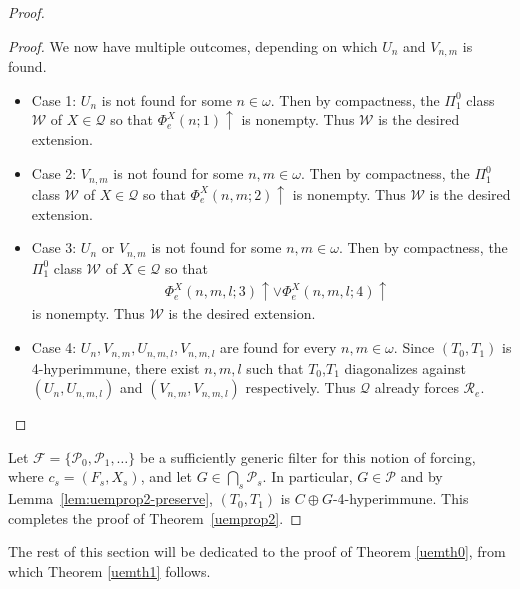 \documentclass{amsart}
\theoremstyle{definition}
\theoremstyle{remark}
\numberwithin{equation}{section}
\theoremstyle{noparens}
\def\mcal{\mathcal}
\newcommand{\Fcal}{\mathcal{F}}
\def\iatfshyp{4-hyperimmune}
\def\diagonalagainst{diagonalizes against}
\begin{document}
\begin{proof}
\begin{proof}
\smallskip

We now have multiple outcomes, depending on which $U_n$ and $V_{n,m}$ is found.
\begin{itemize}
	\item Case 1: $U_n$ is not found for some $n \in \omega$.
	Then by compactness,
the  $\Pi_1^0$ class $\mcal{W}$ of $X\in \mcal{Q}$ so that
$\Phi_e^X(n;1)\uparrow$ is nonempty.
Thus $\mcal{W}$ is the desired extension.

	\item Case 2: $V_{n,m}$ is not found for some $n, m \in \omega$.
Then by compactness,
the  $\Pi_1^0$ class $\mcal{W}$ of $X\in \mcal{Q}$ so that
$\Phi_{e}^{X}(n, m;2) \uparrow$ is nonempty.
Thus $\mcal{W}$ is the desired extension.

	\item Case 3: $U_n$ or $V_{n,m}$ is not found for some $n,m \in \omega$.
	Then by compactness,
the  $\Pi_1^0$ class $\mcal{W}$ of $X\in \mcal{Q}$ so that
\begin{align}\nonumber
&\Phi_e^X(n,m,l;3)\uparrow\vee
\Phi_e^X(n,m,l;4)\uparrow
\end{align}
is nonempty.
Thus $\mcal{W}$ is the desired extension.

\item Case 4: $U_n, V_{n,m},U_{n,m,l},V_{n,m,l}$ are found for every $n,m \in \omega$.
Since $(T_0,T_1)$ is \iatfshyp, there exist
$n, m,l$ such that $T_0$,$T_1$ \diagonalagainst\
$(U_{n},U_{n,m,l})$ and
$(V_{n, m},V_{n, m,l})$ respectively.
Thus $\mcal{Q}$ already forces $\mathcal{R}_e$.
\end{itemize}

\end{proof}

Let $\Fcal = \{\mcal{P}_0, \mcal{P}_1, \dots \}$ be a sufficiently generic filter for this notion of forcing,
where $c_s = (F_s, X_s)$, and let $G \in \bigcap_s \mcal{P}_s$. In particular, $G \in \mcal{P}$ and by Lemma~\ref{lem:uemprop2-preserve},
$(T_0,T_1)$ is $C\oplus G$-\iatfshyp.
This completes the proof of Theorem~\ref{uemprop2}.
\end{proof}

The rest of this section will be dedicated to the proof of Theorem \ref{uemth0}, from which Theorem \ref{uemth1} follows.
\end{document}
